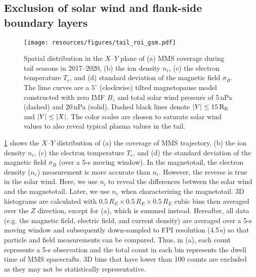 \documentclass[draft]{agujournal2019}
\begin{document}
\subsection{Exclusion of solar wind and flank-side boundary layers}\label{sec:define_roi}

\begin{figure}
\centering
\noindent\texttt{[image: resources/figures/tail\_roi\_gsm.pdf]}
\caption{
Spatial distribution in the $X$--$Y$ plane of (a) MMS coverage during tail seasons in 2017--2020, (b) the ion density $n_i$, (c) the electron temperature $T_e$, and (d) standard deviation of the magnetic field $\sigma_B$. The lime curves are a $5^\circ$ (clockwise) tilted magnetopause model \cite{Lin2010} constructed with zero IMF $B_z$ and total solar wind pressure of 5\,\si{nPa} (dashed) and 20\,\si{nPa} (solid). Dashed black lines denote ${\abs{Y}\leq 15\,\si{R_E}}$ and ${\abs{Y}\leq\abs{X}}$. The color scales are chosen to saturate solar wind values to also reveal typical plasma values in the tail.
}
\label{fig:tail_roi}
\end{figure}

\cref{fig:tail_roi} shows the $X$--$Y$ distribution of (a) the coverage of MMS trajectory, (b) the ion density $n_i$, (c) the electron temperature $T_e$, and (d) the standard deviation of the magnetic field $\sigma_B$ (over a 5-s moving window). In the magnetotail, the electron density ($n_e$) measurement is more accurate than $n_i$. However, the reverse is true in the solar wind. Here, we use $n_i$ to reveal the differences between the solar wind and the magnetotail. Later, we use $n_e$ when characterizing the magnetotail. 3D histograms are calculated with ${0.5\,\si{R_E}\times0.5\,\si{R_E}\times0.5\,\si{R_E}}$ cubic bins then averaged over the $Z$ direction, except for (a), which is summed instead. Hereafter, all data (e.g. the magnetic field, electric field, and current density) are averaged over a 5-s moving window and subsequently down-sampled to FPI resolution (4.5\,\si{s}) so that particle and field measurements can be compared. Thus, in (a), each count represents a 5-s observation and the total count in each bin represents the dwell time of MMS spacecrafts. 3D bins that have lower than 100 counts are excluded as they may not be statistically representative.
\end{document}
